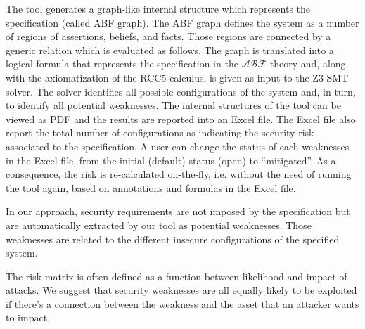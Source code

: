 \documentclass[conference]{IEEEtran}
\newcommand{\assertionRegion}{\mathcal{A}}
\newcommand{\beliefRegion}{\mathcal{B}}
\newcommand{\factRegion}{\mathcal{F}}
\newcommand{\abftheory}{\assertionRegion\beliefRegion\factRegion}
\begin{document}
The tool generates a graph-like internal structure which represents
the specification (called ABF graph). The ABF graph defines the system as
a number of regions of assertions, beliefs, and facts. Those regions
are connected by a generic relation which is evaluated as follows.
The graph is translated into 
a logical formula that represents the specification in the $\abftheory$-theory and,
along with the axiomatization of the RCC5 calculus, is given as input to the Z3 SMT solver.
The solver identifies all possible configurations of the system and, in turn,
to identify all potential weaknesses. 
The internal structures of the tool
can be viewed as PDF and the results are reported into an Excel file.
The Excel file also report the total number of configurations as indicating
the security risk associated to the specification. A user can change the status
of each weaknesses in the Excel file, from the initial (default) status (open)
to ``mitigated''. As a consequence, the risk is re-calculated on-the-fly, i.e.
without the need of running the tool again, based on annotations and formulas 
in the Excel file.

In our approach, security requirements are not imposed by the
specification but are automatically extracted by our tool as potential weaknesses.
Those weaknesses are related to the different insecure configurations 
of the specified system. 

The risk matrix is often defined as a function between 
likelihood and impact of attacks. We suggest
that security weaknesses are all equally likely to be exploited
if there's a connection between the weakness and the asset that
an attacker wants to impact. 
\end{document}
